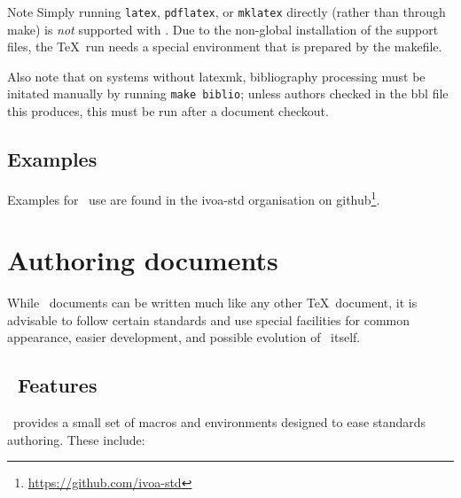 \documentclass[11pt,a4paper]{ivoa}
\begin{document}
\begin{admonition}{Note}
Simply running \texttt{latex}, \texttt{pdflatex},
or \texttt{mklatex} directly
(rather than through make) is \emph{not} supported with \ivoatex.  Due
to the non-global installation of the support files, the \TeX\ run needs
a special environment that is prepared by the makefile.

Also note that on systems without latexmk,
bibliography processing must be initated manually by
running \texttt{make biblio}; unless authors checked in the bbl file
this produces, this must be run after a document checkout.
\end{admonition}

\subsection{Examples}

Examples for \ivoatex\ use are found in the ivoa-std organisation on
github\footnote{\url{https://github.com/ivoa-std}}.


\section{Authoring documents}
\label{sect:authoring}

While \ivoatex\ documents can be written much like any other \TeX\
document, it is advisable to follow certain standards and use special
facilities for common appearance, easier development, and possible
evolution of \ivoatex\ itself.

\subsection{\ivoatex\ Features}

\ivoatex\ provides a small set of macros and environments designed
to ease standards authoring.  These include:
\end{document}
